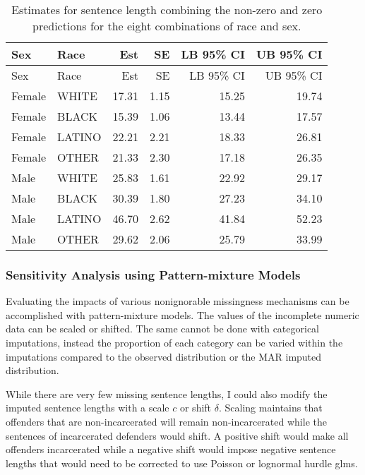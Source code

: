 \documentclass[
  letterpaper,
  DIV=11,
  numbers=noendperiod]{scrartcl}
\begin{document}
\hypertarget{tbl-race-sex-effects}{}
\begin{longtable}[]{@{}llrrrr@{}}
\caption{\label{tbl-race-sex-effects}Estimates for sentence length
combining the non-zero and zero predictions for the eight combinations
of race and sex.}\tabularnewline
\toprule\noalign{}
Sex & Race & Est & SE & LB 95\% CI & UB 95\% CI \\
\midrule\noalign{}
\endfirsthead
\toprule\noalign{}
Sex & Race & Est & SE & LB 95\% CI & UB 95\% CI \\
\midrule\noalign{}
\endhead
\bottomrule\noalign{}
\endlastfoot
Female & WHITE & 17.31 & 1.15 & 15.25 & 19.74 \\
Female & BLACK & 15.39 & 1.06 & 13.44 & 17.57 \\
Female & LATINO & 22.21 & 2.21 & 18.33 & 26.81 \\
Female & OTHER & 21.33 & 2.30 & 17.18 & 26.35 \\
Male & WHITE & 25.83 & 1.61 & 22.92 & 29.17 \\
Male & BLACK & 30.39 & 1.80 & 27.23 & 34.10 \\
Male & LATINO & 46.70 & 2.62 & 41.84 & 52.23 \\
Male & OTHER & 29.62 & 2.06 & 25.79 & 33.99 \\
\end{longtable}

\hypertarget{sensitivity-analysis-using-pattern-mixture-models}{%
\subsubsection{Sensitivity Analysis using Pattern-mixture
Models}\label{sensitivity-analysis-using-pattern-mixture-models}}

Evaluating the impacts of various nonignorable missingness mechanisms
can be accomplished with pattern-mixture models. The values of the
incomplete numeric data can be scaled or shifted. The same cannot be
done with categorical imputations, instead the proportion of each
category can be varied within the imputations compared to the observed
distribution or the MAR imputed distribution.

While there are very few missing sentence lengths, I could also modify
the imputed sentence lengths with a scale \(c\) or shift \(\delta\).
Scaling maintains that offenders that are non-incarcerated will remain
non-incarcerated while the sentences of incarcerated defenders would
shift. A positive shift would make all offenders incarcerated while a
negative shift would impose negative sentence lengths that would need to
be corrected to use Poisson or lognormal hurdle glms.
\end{document}
